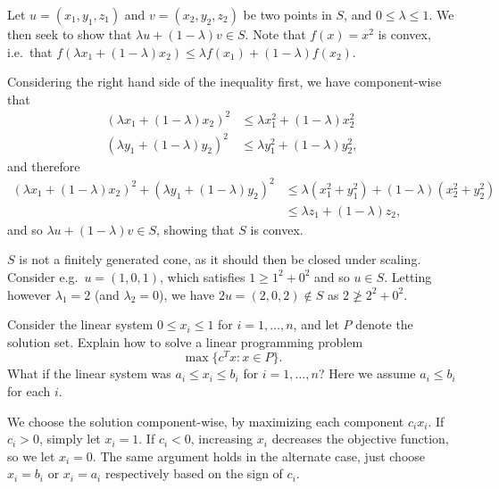 \begin{solution}
  Let $u = (x_1, y_1, z_1)$ and $v = (x_2, y_2, z_2)$ be two points in $S$, and $0 \leq \lambda \leq 1$.
  We then seek to show that $\lambda u + (1 - \lambda) v \in S$.
  Note that $f(x) = x^2$ is convex, i.e.\ that $f(\lambda x_1 + (1 - \lambda) x_2) \leq \lambda f(x_1) + (1 - \lambda) f(x_2)$.

  Considering the right hand side of the inequality first, we have component-wise that
  \begin{equation}
    \begin{split}
      (\lambda x_1 + (1 - \lambda) x_2)^2 &\leq \lambda x_1^2 + (1 - \lambda) x_2^2 \\
      (\lambda y_1 + (1 - \lambda) y_2)^2 &\leq \lambda y_1^2 + (1 - \lambda) y_2^2,
    \end{split}
  \end{equation}
  and therefore
  \begin{equation}
    \begin{split}
      (\lambda x_1 + (1 - \lambda) x_2)^2 + (\lambda y_1 + (1 - \lambda) y_2)^2 &\leq \lambda (x_1^2 + y_1^2) + (1 - \lambda) (x_2^2 + y_2^2) \\
      &\leq \lambda z_1 + (1 - \lambda) z_2,
    \end{split}
  \end{equation}
  and so $\lambda u + (1 - \lambda) v \in S$, showing that $S$ is convex.

  $S$ is not a finitely generated cone, as it should then be closed under scaling.
  Consider e.g.\ $u = (1,0,1)$, which satisfies $1 \geq 1^2 + 0^2$ and so $u \in S$.
  Letting however $\lambda_1 = 2$ (and $\lambda_2 = 0$), we have $2u = (2,0,2) \notin S$ as $2 \not\geq 2^2 + 0^2$.
\end{solution}

\begin{exercise}
  Consider the linear system $0 \leq x_i \leq 1$ for $i = 1, \ldots, n$, and let $P$ denote the solution set.
  Explain how to solve a linear programming problem
  \begin{equation}
    \max\{ c^T x : x \in P \}.
  \end{equation}
  What if the linear system was $a_i \leq x_i \leq b_i$ for $i = 1, \ldots, n$?
  Here we assume $a_i \leq b_i$ for each $i$.
\end{exercise}

\begin{solution}
  We choose the solution component-wise, by maximizing each component $c_i x_i$.
  If $c_i > 0$, simply let $x_i = 1$.
  If $c_i < 0$, increasing $x_i$ decreases the objective function, so we let $x_i = 0$.
  The same argument holds in the alternate case, just choose $x_i = b_i$ or $x_i = a_i$ respectively based on the sign of $c_i$.
\end{solution}


